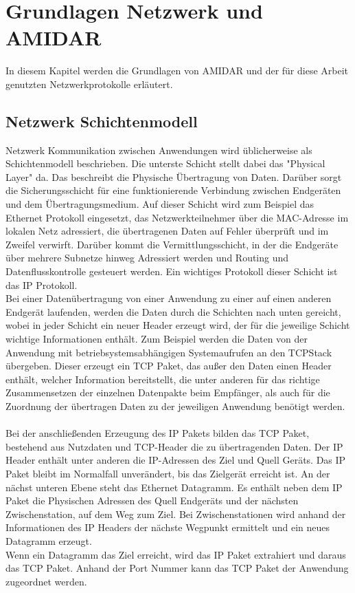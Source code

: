 \chapter{Grundlagen Netzwerk und AMIDAR}
In diesem Kapitel werden die Grundlagen von AMIDAR und der für diese Arbeit genutzten Netzwerkprotokolle erläutert. 

\section{Netzwerk Schichtenmodell}
Netzwerk Kommunikation zwischen Anwendungen wird üblicherweise als Schichtenmodell beschrieben.  
Die unterste Schicht stellt dabei das {}"Physical Layer"{} da. Das beschreibt die Physische Übertragung von Daten. 
Darüber sorgt die Sicherungsschicht für eine funktionierende Verbindung zwischen Endgeräten und dem Übertragungsmedium. Auf dieser Schicht wird zum Beispiel das Ethernet Protokoll eingesetzt, das Netzwerkteilnehmer über die MAC-Adresse im lokalen Netz adressiert, die übertragenen Daten auf Fehler überprüft und im Zweifel verwirft. 
Darüber kommt die Vermittlungsschicht, in der die Endgeräte über mehrere Subnetze hinweg Adressiert werden und Routing und Datenflusskontrolle gesteuert werden. Ein wichtiges Protokoll dieser Schicht ist das IP Protokoll. \\
Bei einer Datenübertragung von einer Anwendung zu einer auf einen anderen Endgerät laufenden, werden die Daten durch die Schichten nach unten gereicht, wobei in jeder Schicht ein neuer Header erzeugt wird, der für die jeweilige Schicht wichtige Informationen enthält. Zum Beispiel werden die Daten von der Anwendung mit betriebsystemsabhängigen Systemaufrufen an den TCPStack übergeben. Dieser erzeugt ein TCP Paket, das außer den Daten einen Header enthält, welcher Information bereitstellt, die unter anderen für das richtige Zusammensetzen der einzelnen Datenpakte beim Empfänger, als auch für die Zuordnung der übertragen Daten zu der jeweiligen Anwendung benötigt werden.\\\\
Bei der anschließenden Erzeugung des IP Pakets bilden das TCP Paket, bestehend aus Nutzdaten und TCP-Header die zu übertragenden Daten. Der IP Header enthält unter anderen die IP-Adressen des Ziel und Quell Geräts. Das IP Paket bleibt im Normalfall unverändert, bis das Zielgerät erreicht ist. An der nächst unteren Ebene steht das Ethernet Datagramm. Es enthält neben dem IP Paket die Physischen Adressen des Quell Endgeräts und der nächsten Zwischenstation, auf dem Weg zum Ziel. Bei Zwischenstationen wird anhand der Informationen des IP Headers der nächste Wegpunkt ermittelt und ein neues Datagramm erzeugt. \\
Wenn ein Datagramm das Ziel erreicht, wird das IP Paket extrahiert und daraus das TCP Paket. Anhand der Port Nummer kann das TCP Paket der Anwendung zugeordnet werden.



